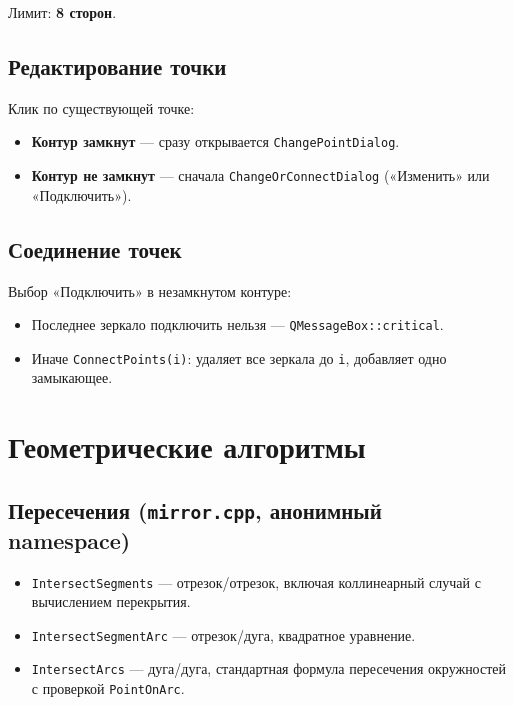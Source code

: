 \documentclass[a4paper,11pt]{article}
\newcommand{\file}[1]{\texttt{#1}}
\newcommand{\code}[1]{\texttt{#1}}
\begin{document}
Лимит: \textbf{8 сторон}.

\subsection{Редактирование точки}

Клик по существующей точке:
\begin{itemize}[leftmargin=*]
    \item \textbf{Контур замкнут} — сразу открывается
          \code{ChangePointDialog}.
    \item \textbf{Контур не замкнут} — сначала
          \code{ChangeOrConnectDialog} («Изменить» или «Подключить»).
\end{itemize}

\subsection{Соединение точек}

Выбор «Подключить» в незамкнутом контуре:
\begin{itemize}[leftmargin=*]
    \item Последнее зеркало подключить нельзя —
          \code{QMessageBox::critical}.
    \item Иначе \code{ConnectPoints(i)}: удаляет все зеркала до
          \code{i}, добавляет одно замыкающее.
\end{itemize}

\section{Геометрические алгоритмы}

\subsection{Пересечения (\file{mirror.cpp}, анонимный namespace)}

\begin{itemize}[leftmargin=*]
    \item \code{IntersectSegments} — отрезок/отрезок,
          включая коллинеарный случай с вычислением перекрытия.
    \item \code{IntersectSegmentArc} — отрезок/дуга, квадратное
          уравнение.
    \item \code{IntersectArcs} — дуга/дуга, стандартная формула
          пересечения окружностей с проверкой \code{PointOnArc}.
\end{itemize}
\end{document}
